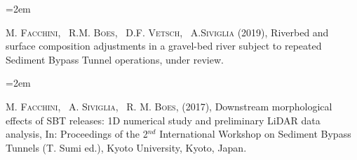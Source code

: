 \documentclass{scrartcl}
\newcommand{\MarginText}[1]{\marginpar{\raggedleft\itshape\small#1}} %
\newlength{\datebox}\settowidth{\datebox}{Spring 2011} %
\newcommand{\NewEntry}[3]{\noindent\hangindent=2em\hangafter=0 \parbox{\datebox}{\small \textit{#1}}\hspace{1.5em} #2 #3 %
\vspace{0.5em}} %
\newcommand{\Description}[1]{\hangindent=2em\hangafter=0\noindent\raggedright\footnotesize{#1}\par\normalsize\vspace{1em}} %
\begin{document}
\begin{cv}{}
%
%
%
%
%
%
%
%
%
%
%


\vspace{1em}

\Description{\MarginText{2019}
	M. \textsc{Facchini}, ~R.M. \textsc{Boes}, ~D.F. \textsc{Vetsch}, ~A.\textsc{Siviglia} (2019), Riverbed and surface composition adjustments in a gravel-bed river subject to repeated Sediment Bypass Tunnel operations, under review.}


\Description{\MarginText{2017}
	M. \textsc{Facchini}, ~A. \textsc{Siviglia}, ~R. M. \textsc{Boes}, (2017), Downstream morphological effects of SBT releases: 1D numerical study and preliminary LiDAR data analysis, In: Proceedings of the 2$^{nd}$ International Workshop on Sediment Bypass Tunnels (T. Sumi ed.), Kyoto University, Kyoto, Japan.}


\end{cv}
\end{document}
